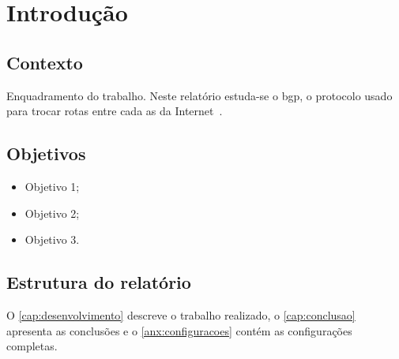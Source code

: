 \chapter{Introdução}
\label{cap:introducao}

\section{Contexto}

Enquadramento do trabalho. Neste relatório estuda-se o \gls{bgp}, o protocolo
usado para trocar rotas entre cada \gls{as} da Internet~\cite{rfc4271}.

\section{Objetivos}

\begin{itemize}
  \item Objetivo 1;
  \item Objetivo 2;
  \item Objetivo 3.
\end{itemize}

\section{Estrutura do relatório}

O \cref{cap:desenvolvimento} descreve o trabalho realizado, o
\cref{cap:conclusao} apresenta as conclusões e o \cref{anx:configuracoes}
contém as configurações completas.
